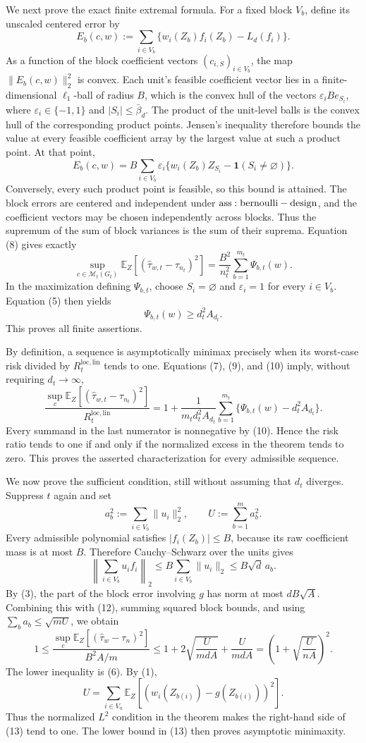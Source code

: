 We next prove the exact finite extremal formula. For a fixed block \(V_b\), define its unscaled centered error by
\[
E_b(c,w):=\sum_{i\in V_b}\{w_i(Z_b)f_i(Z_b)-L_d(f_i)\}.
\]
As a function of the block coefficient vectors \((c_{i,S})_{i\in V_b}\), the map \(\lVert E_b(c,w)\rVert_2^2\) is convex. Each unit's feasible coefficient vector lies in a finite-dimensional \(\ell_1\)-ball of radius \(B\), which is the convex hull of the vectors \(\varepsilon_iB e_{S_i}\), where \(\varepsilon_i\in\{-1,1\}\) and \(|S_i|\le\bar\beta_d\). The product of the unit-level balls is the convex hull of the corresponding product points. Jensen's inequality therefore bounds the value at every feasible coefficient array by the largest value at such a product point. At that point,
\[
E_b(c,w)=B\sum_{i\in V_b}\varepsilon_i
\{w_i(Z_b)Z_{S_i}-\mathbf1(S_i\ne\varnothing)\}.
\tag{8}
\]
Conversely, every such product point is feasible, so this bound is attained. The block errors are centered and independent under \({\rm ass:bernoulli-design}\), and the coefficient vectors may be chosen independently across blocks. Thus the supremum of the sum of block variances is the sum of their suprema. Equation (8) gives exactly
\[
\sup_{c\in\mathcal M_t(G_t)}
\mathbb E_Z[(\widehat\tau_{w,t}-\tau_{n_t})^2]
=\frac{B^2}{n_t^2}\sum_{b=1}^{m_t}\Psi_{b,t}(w).
\tag{9}
\]
In the maximization defining \(\Psi_{b,t}\), choose \(S_i=\varnothing\) and \(\varepsilon_i=1\) for every \(i\in V_b\). Equation (5) then yields
\[
\Psi_{b,t}(w)\ge d_t^2A_{d_t}.
\tag{10}
\]
This proves all finite assertions.

By definition, a sequence is asymptotically minimax precisely when its worst-case risk divided by \(R_t^{\mathrm{loc,lin}}\) tends to one. Equations (7), (9), and (10) imply, without requiring \(d_t\to\infty\),
\[
\frac{\sup_c\mathbb E_Z[(\widehat\tau_{w,t}-\tau_{n_t})^2]}
{R_t^{\mathrm{loc,lin}}}
=1+\frac{1}{m_td_t^2A_{d_t}}
\sum_{b=1}^{m_t}\{\Psi_{b,t}(w)-d_t^2A_{d_t}\}.
\tag{11}
\]
Every summand in the last numerator is nonnegative by (10). Hence the risk ratio tends to one if and only if the normalized excess in the theorem tends to zero. This proves the asserted characterization for every admissible sequence.

We now prove the sufficient condition, still without assuming that \(d_t\) diverges. Suppress \(t\) again and set
\[
a_b^2:=\sum_{i\in V_b}\lVert u_i\rVert_2^2,
\qquad U:=\sum_{b=1}^m a_b^2.
\]
Every admissible polynomial satisfies \(|f_i(Z_b)|\le B\), because its raw coefficient mass is at most \(B\). Therefore Cauchy--Schwarz over the units gives
\[
\left\lVert\sum_{i\in V_b}u_if_i\right\rVert_2
\le B\sum_{i\in V_b}\lVert u_i\rVert_2
\le B\sqrt d\,a_b.
\tag{12}
\]
By (3), the part of the block error involving \(g\) has norm at most \(dB\sqrt A\). Combining this with (12), summing squared block bounds, and using \(\sum_ba_b\le\sqrt{mU}\), we obtain
\[
1\le
\frac{\sup_c\mathbb E_Z[(\widehat\tau_w-\tau_n)^2]}{B^2A/m}
\le1+2\sqrt{\frac{U}{mdA}}+\frac{U}{mdA}
=\left(1+\sqrt{\frac{U}{nA}}\right)^2.
\tag{13}
\]
The lower inequality is (6). By (1),
\[
U=\sum_{i\in V_n}\mathbb E_Z[(w_i(Z_{b(i)})-g(Z_{b(i)}))^2].
\]
Thus the normalized \(L^2\) condition in the theorem makes the right-hand side of (13) tend to one. The lower bound in (13) then proves asymptotic minimaxity.

